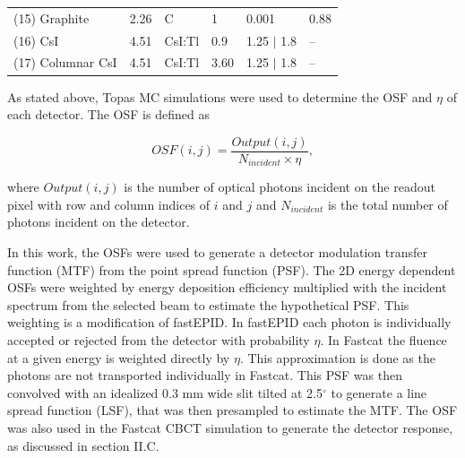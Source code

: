\begin{table}[]
\begin{tabular}{llllll}
(15) Graphite          & 2.26                                                         & C                       & 1                                                        & 0.001                                                                           & 0.88         \\
(16) CsI               & 4.51                                                         & CsI:Tl                  & 0.9                                                      & 1.25 $|$ 1.8                                                                    & --           \\
(17) Columnar CsI      & 4.51                                                         & CsI:Tl                  & 3.60                                                     & 1.25 $|$ 1.8                                                                    & --          
\end{tabular}
\centering
\vspace*{2ex}
\end{table}


As stated above, Topas MC simulations were used to determine the OSF and $\eta$ of each detector. The OSF is defined as

\begin{equation}
    OSF(i,j) = \frac{Output(i,j)}{N_{incident}\times\eta},
\end{equation}

\noindent where $Output(i,j)$ is the number of optical photons incident on the readout pixel with row and column indices of $i$ and $j$ and $N_{incident}$ is the total number of photons incident on the detector.

In this work, the OSFs were used to generate a detector modulation transfer function (MTF) from the point spread function (PSF). The 2D energy dependent OSFs were weighted by energy deposition efficiency multiplied with the incident spectrum from the selected beam to estimate the hypothetical PSF. This weighting is a modification of fastEPID. In fastEPID each photon is individually accepted or rejected from the detector with probability $\eta$. In Fastcat the fluence at a given energy is weighted directly by $\eta$. This approximation is done as the photons are not transported individually in Fastcat. This PSF was then convolved with an idealized 0.3 mm wide slit tilted at 2.5$^\circ$ to generate a line spread function (LSF), that was then presampled to estimate the MTF. The OSF was also used in the Fastcat CBCT simulation to generate the detector response, as discussed in section II.C. 
 
